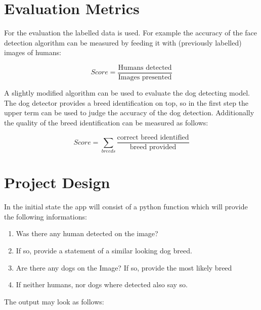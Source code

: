 \documentclass[paper=A4, DIV=11, parskip=half]{scrartcl}
\begin{document}
\section*{Evaluation Metrics}

For the evaluation the labelled data is used. For example the accuracy of the face
detection algorithm can be measured by feeding it with (previously labelled) images of
humans: 

$$ Score = \frac{\textrm{Humans detected}}{\textrm{Images presented}}$$

A slightly modified algorithm can be used to evaluate the dog detecting model. The dog
detector provides a breed identification on top, so in the first step the upper term can
be used to judge the accuracy of the dog detection. Additionally the quality of the breed
identification can be measured as follows:

$$ Score = \sum_{breeds}{\frac{\textrm{correct breed identified}}{\textrm{breed provided}}} $$


\section*{Project Design}

In the initial state the app will consist of a python function which will provide the
following informations:

\begin{enumerate}
  \item Was there any human detected on the image?
  \item If so, provide a statement of a similar looking dog breed.
  \item Are there any dogs on the Image? If so,  provide the most likely breed
  \item If neither humans, nor dogs where detected also say so.
\end{enumerate}

The output may look as follows:
\end{document}
